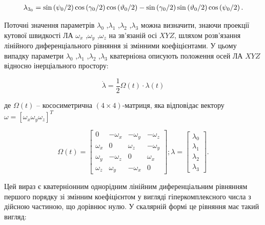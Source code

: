 \[\begin{array}{l}
{\lambda_{3_{0}} =\sin  \left({\psi_{0}  \mathord{\left/{\vphantom{
\psi_{0}  2}}\right.\kern-\nulldelimiterspace} 2} \right)\cos  \left({\gamma_{0}  
\mathord{\left/{\vphantom{\gamma_{0}  2}}\right.\kern-\nulldelimiterspace} 2} \right)
\cos  \left({\vartheta_{0}  \mathord{\left/{\vphantom{\vartheta_{0}  2}}\right.
\kern-\nulldelimiterspace} 2} \right)-\sin  \left({\gamma_{0}  \mathord{\left/{
\vphantom{\gamma_{0}  2}}\right.\kern-\nulldelimiterspace} 2} \right)\sin  \left({
\vartheta_{0}  \mathord{\left/{\vphantom{\vartheta_{0}  2}}\right.\kern-\nulldelimiterspace} 
2} \right)\cos  \left({\psi_{0}  \mathord{\left/{\vphantom{\psi_{0}  2}}\right.
\kern-\nulldelimiterspace} 2} \right).} \end{array}\] 

Поточні значення параметрів $\lambda_{0}$ ,$\lambda_{1}$ ,$\lambda_{2}$ ,$\lambda_{3}$ можна 
визначити, знаючи проекції кутової швидкості ЛА $\omega_{x}$ ,$\omega_{y}$ ,$\omega_{z}$ 
на зв'язаній осі $XYZ$, шляхом розв'язання лінійного диференціального рівняння 
зі змінними коефіцієнтами. У цьому випадку параметри $\lambda_{0}$ ,$\lambda_{1}$ 
,$\lambda_{2}$ ,$\lambda_{3}$ кватерніона  описують  положення  осей ЛА  $XYZ$  відносно  
інерціального простору:

\[\dot{\lambda }=\frac{1}{2} \Omega(t)\cdot \lambda(t)\] 
\begin{ESKDexplanation}
\item де $\Omega(t)$ -- кососиметрична $(4\times 4)$-матриця, яка 
відповідає вектору $\omega =[\omega_{x} \omega_{y} \omega_{z}]^{T}  $
\end{ESKDexplanation}
\[\Omega (t)=\left[
\begin{array}{cccc} 
  {0} & {-\omega_{x}} & {-\omega_{y}} & {-\omega_{z}} \\ 
  {\omega_{x}} & {0} & {\omega_{z}} & {-\omega_{y}} \\ 
  {\omega_{y}} & {-\omega_{z}} & {0} & {\omega_{x}} \\ 
  {\omega_{z}} & {\omega_{y}} & {-\omega_{x}} & {0} 
\end{array}\right];
\lambda =\left[\begin{array}{c} 
  {\lambda_{0}} \\ 
  {\lambda_{1}} \\ 
  {\lambda_{2}} \\ 
  {\lambda_{3}} 
\end{array}
\right].\] 

Цей вираз є кватерніонним однорідним лінійним диференціальним рівнянням першого порядку 
зі змінним коефіцієнтом у вигляді гіперкомплексного числа з дійсною частиною, що 
дорівнює нулю. У скалярній формі це рівняння  має такий вигляд:

